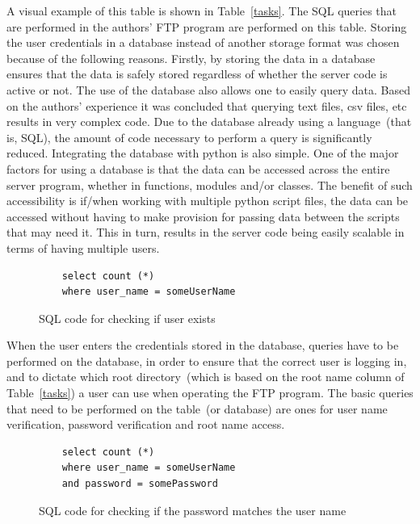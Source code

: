 \documentclass[journal, a4paper]{IEEEtran}
\begin{document}
A visual example of this table is shown in Table~\ref{tasks}. The SQL queries that are performed in the authors' FTP  program are performed on this table. Storing the user credentials in a database instead of another storage format was chosen because of the following reasons. Firstly, by storing the data in a database ensures that the data is safely stored regardless of whether the server code is active or not. The use of the database also allows one to easily query data. Based on the authors' experience it was concluded that querying text files, csv files, etc results in very complex code. Due to the database already using a language~(that is, SQL), the amount of code necessary to perform a query is significantly reduced. Integrating the database with python is also simple. One of the major factors for using a database is that the data can be accessed across the entire server program, whether in functions, modules and/or classes. The benefit of such accessibility is if/when working with multiple python script files, the data can be accessed without having to make provision for passing data between the scripts that may need it. This in turn, results in the server code being easily scalable in terms of having multiple users.






\begin{figure}[hbtp]
	\begin{lstlisting}
	select count (*) 
	where user_name = someUserName
	\end{lstlisting}
	\caption{SQL code for checking if user exists}
	\label {sqluser}
\end{figure}

When the user enters the credentials stored in the database,  queries have to be performed on the database, in order to ensure that the correct user is logging in, and to dictate which root directory~(which is based on the root name column of Table~\ref{tasks}) a user can use when operating the FTP program. The basic queries that need to be performed on the table~(or database) are ones for user name verification, password verification and root name access.

\begin{figure}[hbtp]
	\begin{lstlisting}
	select count (*) 
	where user_name = someUserName
	and password = somePassword
	\end{lstlisting}
	\caption{SQL code for checking if the password matches the user name}
	\label {sqlpass}
\end{figure}
\end{document}
